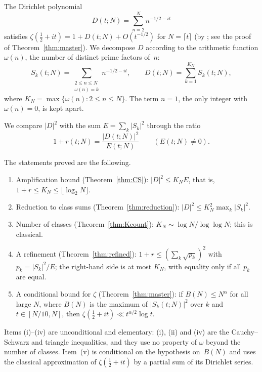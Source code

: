 \documentclass[11pt]{amsart}
\theoremstyle{definition}
\theoremstyle{remark}
\newcommand{\half}{\tfrac{1}{2}}
\begin{document}
The Dirichlet polynomial
\begin{equation}\label{eq:D_def}
  D(t;N) = \sum_{n=2}^{N} n^{-1/2 - it}
\end{equation}
satisfies $\zeta(\half+it)=1+D(t;N)+O(t^{-1/2})$ for $N=\lceil t\rceil$
(by \cite[Theorem~4.11]{titchmarsh1986}; see the proof of
Theorem~\ref{thm:master}).  We decompose $D$ according to the arithmetic
function $\omega(n)$, the number of distinct prime factors of~$n$:
\begin{equation}\label{eq:Sk_def}
  S_k(t;N) = \sum_{\substack{2\le n \le N \\ \omega(n) = k}}
    n^{-1/2-it}, \qquad
  D(t;N) = \sum_{k=1}^{K_N} S_k(t;N),
\end{equation}
where $K_N = \max\{\omega(n) : 2 \le n \le N\}$.  The term $n=1$, the only
integer with $\omega(n)=0$, is kept apart.

We compare $|D|^2$ with the sum $E = \sum_k |S_k|^2$ through the ratio
\begin{equation}\label{eq:1pr_def}
  1 + r(t;N) = \frac{|D(t;N)|^2}{E(t;N)}\qquad (E(t;N)\neq0).
\end{equation}

The statements proved are the following.
\begin{enumerate}[label=(\roman*)]
  \item Amplification bound (Theorem~\ref{thm:CS}):
    $|D|^2\le K_N E$, that is, $1+r \le K_N \le \lfloor \log_2 N \rfloor$.
  \item Reduction to class sums (Theorem~\ref{thm:reduction}):
    $|D|^2 \le K_N^2 \max_k|S_k|^2$.
  \item Number of classes (Theorem~\ref{thm:Kcount}):
    $K_N \sim \log N / \log\log N$; this is classical.
  \item A refinement (Theorem~\ref{thm:refined}):
    $1+r \le (\sum_k \sqrt{p_k})^2$ with $p_k=|S_k|^2/E$; the right-hand
    side is at most $K_N$, with equality only if all $p_k$ are equal.
  \item A conditional bound for $\zeta$ (Theorem~\ref{thm:master}):
    if $B(N) \le N^\alpha$ for all large $N$, where $B(N)$ is the maximum
    of $|S_k(t;N)|^2$ over $k$ and $t\in[N/10,N]$, then
    $\zeta(\half+it) \ll t^{\alpha/2}\log t$.
\end{enumerate}

\noindent
Items (i)--(iv) are unconditional and elementary: (i), (ii) and (iv) are
the Cauchy--Schwarz and triangle inequalities, and they use no property of
$\omega$ beyond the number of classes.  Item~(v) is conditional on the
hypothesis on~$B(N)$ and uses the classical approximation of
$\zeta(\half+it)$ by a partial sum of its Dirichlet series.
\end{document}
